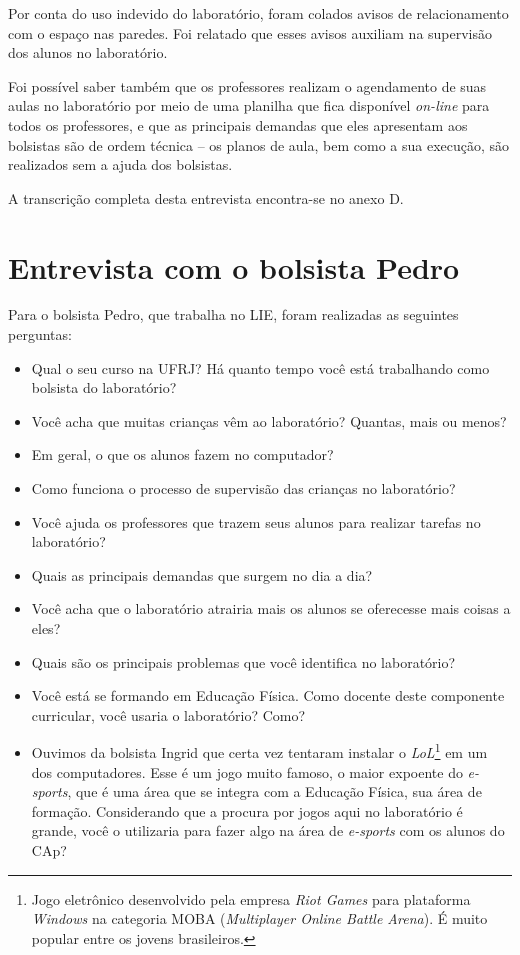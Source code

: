 Por conta do uso indevido do laboratório, foram colados avisos de relacionamento com o espaço nas paredes. Foi relatado que esses avisos auxiliam na supervisão dos alunos no laboratório.

Foi possível saber também que os professores realizam o agendamento de suas aulas no laboratório por meio de uma planilha que fica disponível \textit{on-line} para todos os professores, e que as principais demandas que eles apresentam aos bolsistas são de ordem técnica -- os planos de aula, bem como a sua execução, são realizados sem a ajuda dos bolsistas.

A transcrição completa desta entrevista encontra-se no anexo D.

\section{Entrevista com o bolsista Pedro}\label{chp:LABEL_CHP_ENT_SEC_PED}

Para o bolsista Pedro, que trabalha no LIE, foram realizadas as seguintes perguntas:

\begin{itemize}
\item{Qual o seu curso na UFRJ? Há quanto tempo você está trabalhando como bolsista do laboratório?}
\item{Você acha que muitas crianças vêm ao laboratório? Quantas, mais ou menos?}
\item{Em geral, o que os alunos fazem no computador?}
\item{Como funciona o processo de supervisão das crianças no laboratório?}
\item{Você ajuda os professores que trazem seus alunos para realizar tarefas no laboratório?}
\item{Quais as principais demandas que surgem no dia a dia?}
\item{Você acha que o laboratório atrairia mais os alunos se oferecesse mais coisas a eles?}
\item{Quais são os principais problemas que você identifica no laboratório?}
\item{Você está se formando em Educação Física. Como docente deste componente curricular, você usaria o laboratório? Como?}
\item{Ouvimos da bolsista Ingrid que certa vez tentaram instalar o \textit{LoL}\footnote{Jogo eletrônico desenvolvido pela empresa \textit{Riot Games} para plataforma \textit{Windows} na categoria MOBA (\textit{Multiplayer Online Battle Arena}). É muito popular entre os jovens brasileiros.} em um dos computadores. Esse é um jogo muito famoso, o maior expoente do \textit{e-sports}, que é uma área que se integra com a Educação Física, sua área de formação. Considerando que a procura por jogos aqui no laboratório é grande, você o utilizaria para fazer algo na área de \textit{e-sports} com os alunos do CAp?}
\end{itemize}

